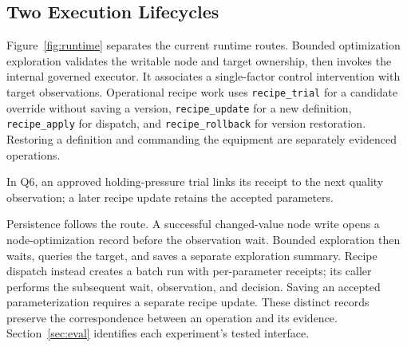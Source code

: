 \subsection{Two Execution Lifecycles}
\label{sec:tasklifecycle}
Figure~\ref{fig:runtime} separates the current runtime routes. Bounded
optimization exploration validates the writable node and target ownership,
then invokes the internal governed executor. It associates a single-factor
control intervention with target observations. Operational recipe work
uses \texttt{recipe\_trial} for a candidate override without saving a
version, \texttt{recipe\_update} for a new definition,
\texttt{recipe\_apply} for dispatch, and \texttt{recipe\_rollback} for
version restoration. Restoring a definition and commanding the equipment
are separately evidenced operations.

In Q6, an approved holding-pressure trial links its receipt to the next
quality observation; a later recipe update retains the accepted parameters.

Persistence follows the route. A successful changed-value node write opens
a node-optimization record before the observation wait. Bounded exploration
then waits, queries the target, and saves a separate exploration summary.
Recipe dispatch instead creates a batch run with per-parameter receipts;
its caller performs the subsequent wait, observation, and decision. Saving
an accepted parameterization requires a separate recipe update. These
distinct records preserve the correspondence between an operation and its
evidence. Section~\ref{sec:eval} identifies each experiment's tested interface.
